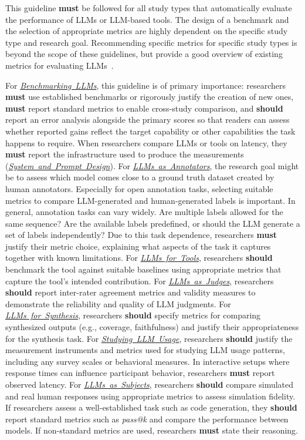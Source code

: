 \documentclass[smallextended]{svjour3}
\newcommand{\must}{\textbf{must}\xspace}
\newcommand{\should}{\textbf{should}\xspace}
\newcommand{\annotators}{\hyperref[sec:llms-as-annotators]{\mbox{\emph{LLMs as Annotators}}}\xspace}
\newcommand{\judges}{\hyperref[sec:llms-as-judges]{\mbox{\emph{LLMs as Judges}}}\xspace}
\newcommand{\synthesis}{\hyperref[sec:llms-for-synthesis]{\mbox{\emph{LLMs for Synthesis}}}\xspace}
\newcommand{\subjects}{\hyperref[sec:llms-as-subjects]{\mbox{\emph{LLMs as Subjects}}}\xspace}
\newcommand{\llmusage}{\hyperref[sec:studying-llm-usage-in-software-engineering]{\mbox{\emph{Studying LLM Usage}}}\xspace}
\newcommand{\newtools}{\hyperref[sec:llms-for-new-software-engineering-tools]{\mbox{\emph{LLMs for Tools}}}\xspace}
\newcommand{\benchmarkingtasks}{\hyperref[sec:benchmarking-llms-for-software-engineering-tasks]{\mbox{\emph{Benchmarking LLMs}}}\xspace}
\newcommand{\annotators}{\href{/study-types/annotators/}{\emph{LLMs as Annotators}}\xspace}
\newcommand{\judges}{\href{/study-types/judges/}{\emph{LLMs as Judges}}\xspace}
\newcommand{\synthesis}{\href{/study-types/synthesis/}{\emph{LLMs for Synthesis}}\xspace}
\newcommand{\subjects}{\href{/study-types/subjects/}{\emph{LLMs as Subjects}}\xspace}
\newcommand{\llmusage}{\href{/study-types/usage/}{\emph{Studying LLM Usage}}\xspace}
\newcommand{\newtools}{\href{/study-types/tools/}{\emph{LLMs for Tools}}\xspace}
\newcommand{\benchmarkingtasks}{\href{/study-types/benchmarking/}{\emph{Benchmarking LLMs}}\xspace}
\newcommand{\design}{\hyperref[sec:report-system-and-prompt-design]{\mbox{\emph{System and Prompt Design}}}\xspace}
\newcommand{\design}{\href{/guidelines/design/}{\emph{System and Prompt Design}}\xspace}
\begin{document}
This guideline \must be followed for all study types that automatically evaluate the performance of LLMs or LLM-based tools.
The design of a benchmark and the selection of appropriate metrics are highly dependent on the specific study type and research goal.
Recommending specific metrics for specific study types is beyond the scope of these guidelines, but \citeauthor{DBLP:journals/corr/abs-2505-08903} provide a good overview of existing metrics for evaluating LLMs~\cite{DBLP:journals/corr/abs-2505-08903}.

For \benchmarkingtasks, this guideline is of primary importance: researchers \must use established benchmarks or rigorously justify the creation of new ones, \must report standard metrics to enable cross-study comparison, and \should report an error analysis alongside the primary scores so that readers can assess whether reported gains reflect the target capability or other capabilities the task happens to require. When researchers compare LLMs or tools on latency, they \must report the infrastructure used to produce the measurements (\design).
For \annotators, the research goal might be to assess which model comes close to a ground truth dataset created by human annotators.
Especially for open annotation tasks, selecting suitable metrics to compare LLM-generated and human-generated labels is important.
In general, annotation tasks can vary widely.
Are multiple labels allowed for the same sequence? Are the available labels predefined, or should the LLM generate a set of labels independently?
Due to this task dependence, researchers \must justify their metric choice, explaining what aspects of the task it captures together with known limitations.
For \newtools, researchers \should benchmark the tool against suitable baselines using appropriate metrics that capture the tool's intended contribution.
For \judges, researchers \should report inter-rater agreement metrics and validity measures to demonstrate the reliability and quality of LLM judgments.
For \synthesis, researchers \should specify metrics for comparing synthesized outputs (e.g., coverage, faithfulness) and justify their appropriateness for the synthesis task.
For \llmusage, researchers \should justify the measurement instruments and metrics used for studying LLM usage patterns, including any survey scales or behavioral measures. In interactive setups where response times can influence participant behavior, researchers \must report observed latency.
For \subjects, researchers \should compare simulated and real human responses using appropriate metrics to assess simulation fidelity.
If researchers assess a well-established task such as code generation, they \should report standard metrics such as \emph{pass@k} and compare the performance between models.
If non-standard metrics are used, researchers \must state their reasoning.
\end{document}
